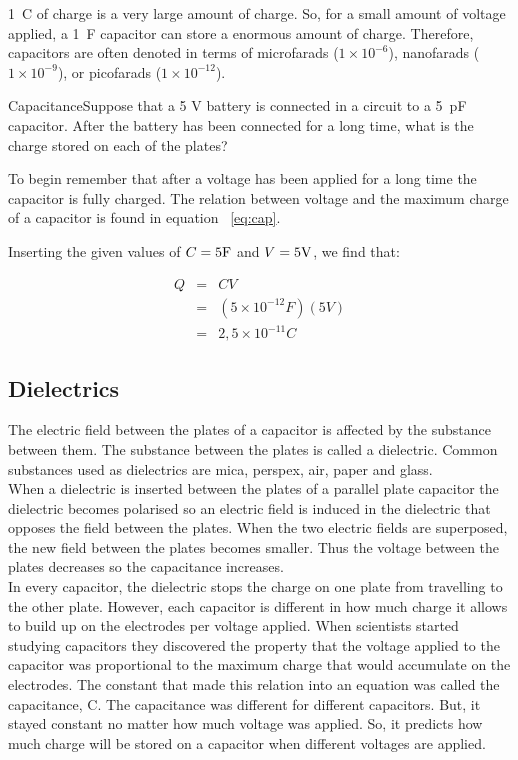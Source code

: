 1~C of charge is a very large amount of charge.  So, for a small
amount of voltage applied, a 1~F capacitor can store a enormous
amount of charge. Therefore, capacitors are often denoted in terms
of microfarads ($1\times10^{-6}$), nanofarads ($1\times10^{-9}$),
or  picofarads ($1\times10^{-12}$).


\begin{wex}{Capacitance}{Suppose that a 5 V battery is connected in a circuit to
a 5~pF capacitor.  After the battery has been connected for a long time, what is
the charge stored on each of the plates?}
{To begin remember that after a voltage has been applied for a
long time the capacitor is fully charged. The relation between
voltage and the maximum charge of a capacitor is found in equation
~\ref{eq:cap}. 

Inserting the given values of $C=5 {\rm F}$ and $V= 5 {\rm V}$, we find that:

\begin{eqnarray*}
Q &=& CV \\
&=& (5\times10^{-12}F)(5V) \\
& = & 2,5\times10^{-11}C
\end{eqnarray*}

}
\end{wex}

\subsection{Dielectrics}
The electric field between the plates of a capacitor is affected by the substance between them. The substance between the plates is called a dielectric. Common substances used as dielectrics are mica, perspex, air, paper and glass.\\
When a dielectric is inserted between the plates of a parallel
plate capacitor the dielectric becomes polarised so an electric
field is induced in the dielectric that opposes the field between
the plates. When the two electric fields are superposed, the new
field between the plates becomes smaller. Thus the voltage between
the plates decreases so the capacitance increases.\\

In every capacitor, the dielectric stops the charge on one plate
from travelling to the other plate.  However, each capacitor is
different in how much charge it allows to build up on the
electrodes per voltage applied.  When scientists started studying
capacitors they discovered the property that the voltage applied
to the capacitor was proportional to the maximum charge that would
accumulate on the electrodes.  The constant that made this
relation into an equation was called the capacitance, C. The
capacitance was different for different capacitors. But, it stayed
constant no matter how much voltage was applied.  So, it predicts
how much charge will be stored on a capacitor when different
voltages are applied.

